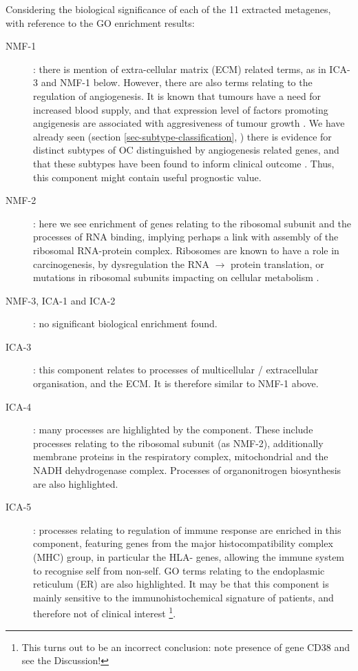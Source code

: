\documentclass[tikz, 12pt,a4paper,oneside,fleqn]{article}
\begin{document}
Considering the biological significance of each of the 11 extracted metagenes, with reference to the GO enrichment results:
\begin{description}
%
\item[NMF-1]: there is mention of extra-cellular matrix (ECM) related terms, as in ICA-3 and NMF-1 below.   However, there are also terms relating to the regulation of angiogenesis.  It is known that tumours have a need for increased blood supply, and that expression level of factors promoting angigenesis are associated with aggresiveness of tumour growth \cite{Nishida2006}.  
We have already seen (section \ref{sec-subtype-classification}, \cite{Glass2015}) there is evidence for distinct subtypes of OC distinguished by angiogenesis related genes, and that these subtypes have been found to inform clinical outcome \cite{Glass2015}.  Thus, this component might contain useful prognostic value.
%
\item[NMF-2]: here we see enrichment of genes relating to the ribosomal subunit and the processes of RNA binding, implying perhaps a link with assembly of the ribosomal RNA-protein complex.   Ribosomes are known to have a role in carcinogenesis, by dysregulation the RNA $\rightarrow$ protein translation, or mutations in ribosomal subunits impacting on cellular metabolism \cite{Sulima2017}.
%
\item[NMF-3, ICA-1 and ICA-2]: no significant biological enrichment found.
%
\item[ICA-3]: this component relates to processes of multicellular / extracellular organisation, and the ECM.  It is therefore similar to NMF-1 above.
\item[ICA-4]: many processes are highlighted by the component.  These include processes relating to the ribosomal subunit (as NMF-2), additionally membrane proteins in the respiratory complex, mitochondrial and the NADH dehydrogenase complex.  Processes of organonitrogen biosynthesis are also highlighted. 
%
\item[ICA-5]: processes relating to regulation of immune response are enriched in this component, featuring genes from the major histocompatibility complex (MHC) group, in particular the HLA- genes, allowing the immune system to recognise self from non-self.  GO terms relating to the endoplasmic reticulum (ER) are also highlighted.  It may be that this component is mainly sensitive to the immunohistochemical signature of patients, and therefore not of clinical interest \footnote{This turns out to be an incorrect conclusion: note presence of gene CD38 and see the Discussion!}.

\end{description}
\end{document}
